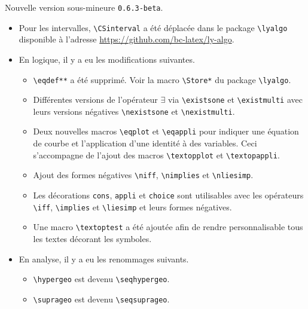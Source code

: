 \documentclass[12pt,a4paper]{article}
\theoremstyle{definition}
\begin{document}
\begin{description}[leftmargin=1em]
    \setlength\itemsep{1em}



    \item[2019-10-21] Nouvelle version sous-mineure \verb+0.6.3-beta+.
    \begin{itemize}
        \item Pour les intervalles, \verb+\CSinterval+ a été déplacée dans le package \verb+\lyalgo+ disponible à l'adresse \url{https://github.com/bc-latex/ly-algo}.

        \item En logique, il y a eu les modifications suivantes.
        \begin{itemize}
        	\item \verb+\eqdef**+ a été supprimé. Voir la macro \verb+\Store*+ du package \verb+\lyalgo+.

        	\item Différentes versions de l'opérateur $\exists$ via \verb+\existsone+ et \verb+\existmulti+ avec leurs versions négatives \verb+\nexistsone+ et \verb+\nexistmulti+.

        	\item Deux nouvelles macros \verb+\eqplot+ et \verb+\eqappli+ pour indiquer une équation de courbe et l'application d'une identité à des variables. Ceci s'accompagne de l'ajout des macros \verb+\textopplot+ et \verb+\textopappli+.

			\item Ajout des formes négatives \verb+\niff+, \verb+\nimplies+ et \verb+\nliesimp+.

        	\item Les décorations \verb+cons+, \verb+appli+ et \verb+choice+ sont utilisables avec les opérateurs \verb+\iff+, \verb+\implies+ et \verb+\liesimp+ et leurs formes négatives.

        	\item Une macro \verb+\textoptest+ a été ajoutée afin de rendre personnalisable tous les textes décorant les symboles.
        \end{itemize}

        \item En analyse, il y a eu les renommages suivants.
        \begin{itemize}
        	\item \verb+\hypergeo+ est devenu \verb+\seqhypergeo+.

        	\item \verb+\suprageo+ est devenu \verb+\seqsuprageo+.
        \end{itemize}


\end{itemize}
\end{description}
\end{document}
